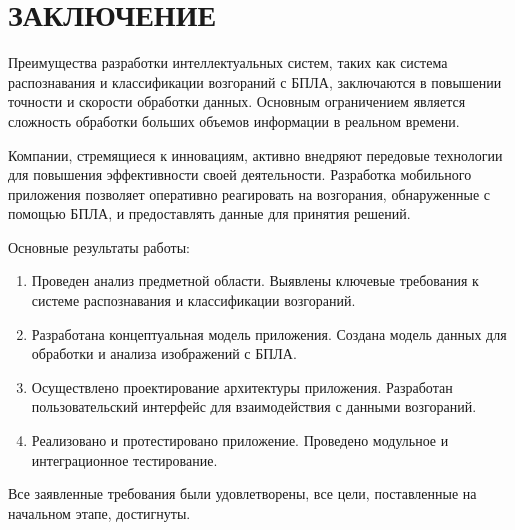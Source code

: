 \section*{ЗАКЛЮЧЕНИЕ}

Преимущества разработки интеллектуальных систем, таких как система распознавания и классификации возгораний с БПЛА, заключаются в повышении точности и скорости обработки данных. Основным ограничением является сложность обработки больших объемов информации в реальном времени.

Компании, стремящиеся к инновациям, активно внедряют передовые технологии для повышения эффективности своей деятельности. Разработка мобильного приложения позволяет оперативно реагировать на возгорания, обнаруженные с помощью БПЛА, и предоставлять данные для принятия решений.

Основные результаты работы:

\begin{enumerate}
\item Проведен анализ предметной области. Выявлены ключевые требования к системе распознавания и классификации возгораний.
\item Разработана концептуальная модель приложения. Создана модель данных для обработки и анализа изображений с БПЛА.
\item Осуществлено проектирование архитектуры приложения. Разработан пользовательский интерфейс для взаимодействия с данными возгораний.
\item Реализовано и протестировано приложение. Проведено модульное и интеграционное тестирование.
\end{enumerate}

Все заявленные требования были удовлетворены, все цели, поставленные на начальном этапе, достигнуты.
